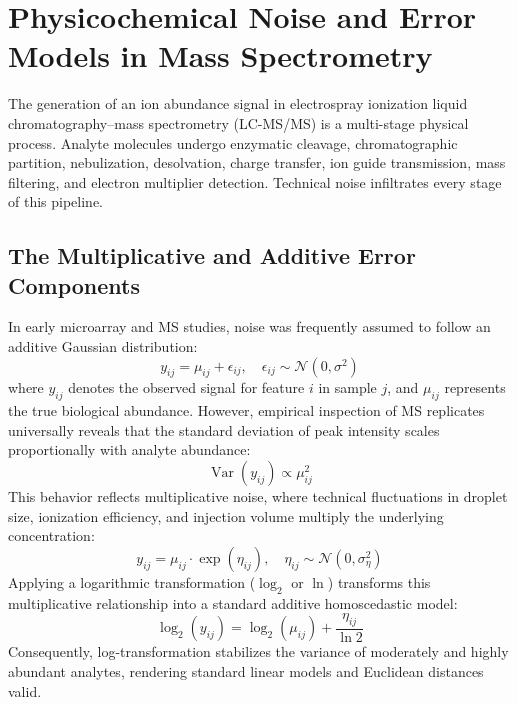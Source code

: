 \documentclass[11pt,oneside]{book}
\begin{document}
\section{Physicochemical Noise and Error Models in Mass Spectrometry}

The generation of an ion abundance signal in electrospray ionization liquid chromatography--mass spectrometry (LC-MS/MS) is a multi-stage physical process. Analyte molecules undergo enzymatic cleavage, chromatographic partition, nebulization, desolvation, charge transfer, ion guide transmission, mass filtering, and electron multiplier detection. Technical noise infiltrates every stage of this pipeline.

\subsection{The Multiplicative and Additive Error Components}

In early microarray and MS studies, noise was frequently assumed to follow an additive Gaussian distribution:
\begin{equation}
y_{ij} = \mu_{ij} + \epsilon_{ij}, \quad \epsilon_{ij} \sim \mathcal{N}(0, \sigma^2)
\end{equation}
where $y_{ij}$ denotes the observed signal for feature $i$ in sample $j$, and $\mu_{ij}$ represents the true biological abundance. However, empirical inspection of MS replicates universally reveals that the standard deviation of peak intensity scales proportionally with analyte abundance:
\begin{equation}
\operatorname{Var}(y_{ij}) \propto \mu_{ij}^2
\end{equation}
This behavior reflects multiplicative noise, where technical fluctuations in droplet size, ionization efficiency, and injection volume multiply the underlying concentration:
\begin{equation}
y_{ij} = \mu_{ij} \cdot \exp(\eta_{ij}), \quad \eta_{ij} \sim \mathcal{N}(0, \sigma_\eta^2)
\end{equation}
Applying a logarithmic transformation ($\log_2$ or $\ln$) transforms this multiplicative relationship into a standard additive homoscedastic model:
\begin{equation}
\log_2(y_{ij}) = \log_2(\mu_{ij}) + \frac{\eta_{ij}}{\ln 2}
\end{equation}
Consequently, log-transformation stabilizes the variance of moderately and highly abundant analytes, rendering standard linear models and Euclidean distances valid.
\end{document}
